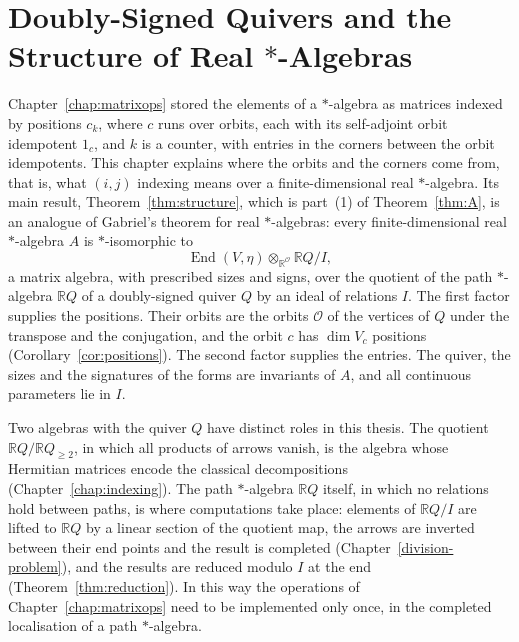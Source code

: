 \documentclass[12pt, a4paper]{report}
\theoremstyle{plain}
\theoremstyle{definition}
\theoremstyle{remark}
\theoremstyle{plain}
\newcommand{\RR}{\mathbb{R}}
\DeclareMathOperator{\End}{End}
\begin{document}
\chapter{Doubly-Signed Quivers and the Structure of Real \texorpdfstring{$*$}{*}-Algebras}
\label{chap:quivers}

Chapter~\ref{chap:matrixops} stored the elements of a $*$-algebra as matrices indexed by positions $c_k$, where $c$ runs over orbits, each with its self-adjoint orbit idempotent $1_c$, and $k$ is a counter, with entries in the corners between the orbit idempotents. This chapter explains where the orbits and the corners come from, that is, what $(i,j)$ indexing means over a finite-dimensional real $*$-algebra. Its main result, Theorem~\ref{thm:structure}, which is part~(1) of Theorem~\ref{thm:A}, is an analogue of Gabriel's theorem for real $*$-algebras: every finite-dimensional real $*$-algebra $A$ is $*$-isomorphic to
\[ \End(V,\eta)\otimes_{\RR^{\mathcal O}}\RR Q/I , \]
a matrix algebra, with prescribed sizes and signs, over the quotient of the path $*$-algebra $\RR Q$ of a doubly-signed quiver $Q$ by an ideal of relations $I$. The first factor supplies the positions. Their orbits are the orbits $\mathcal O$ of the vertices of $Q$ under the transpose and the conjugation, and the orbit $c$ has $\dim V_c$ positions (Corollary~\ref{cor:positions}). The second factor supplies the entries. The quiver, the sizes and the signatures of the forms are invariants of $A$, and all continuous parameters lie in $I$.

Two algebras with the quiver $Q$ have distinct roles in this thesis. The quotient $\RR Q/\RR Q_{\geq2}$, in which all products of arrows vanish, is the algebra whose Hermitian matrices encode the classical decompositions (Chapter~\ref{chap:indexing}). The path $*$-algebra $\RR Q$ itself, in which no relations hold between paths, is where computations take place: elements of $\RR Q/I$ are lifted to $\RR Q$ by a linear section of the quotient map, the arrows are inverted between their end points and the result is completed (Chapter~\ref{division-problem}), and the results are reduced modulo $I$ at the end (Theorem~\ref{thm:reduction}). In this way the operations of Chapter~\ref{chap:matrixops} need to be implemented only once, in the completed localisation of a path $*$-algebra.
\end{document}
